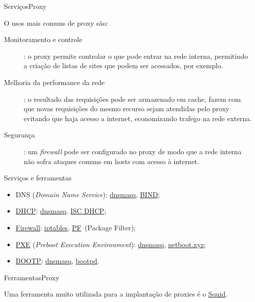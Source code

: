\begin{frame}{Serviços}{Proxy}

O usos mais comuns de proxy são:

\begin{description}
\item[Monitoramento e controle]: o proxy permite controlar o que pode
    entrar na rede interna, permitindo a criação de listas de sites
    que podem ser acessados, por exemplo.

\item[Melhoria da performance da rede]: o resultado das requisições
    pode ser armazenado em cache, fazem com que novas requisições do
    mesmo recurso sejam atendidas pelo proxy evitando que haja acesso
    a internet, economizando trafego na rede externa.

\item[Segurança]: um {\it firewall\/} pode ser configurado no proxy de modo que
a rede interna não sofra ataques comuns em hosts com acesso à
internet.
\end{description}

\end{frame}

\begin{frame}[fragile]{Serviços e ferramentas}


    \begin{itemize}
\item {DNS} ({\it Domain Name Service\/}):
\href{https://thekelleys.org.uk/dnsmasq/doc.html}{dnsmasq},
\href{https://www.isc.org/bind/}{BIND};

\item \href{https://pt.wikipedia.org/wiki/Dynamic_Host_Configuration_Protocol}{DHCP}:
\href{https://thekelleys.org.uk/dnsmasq/doc.html}{dnsmasq},
\href{https://www.isc.org/dhcp/}{ISC DHCP};

 \item \href{https://pt.wikipedia.org/wiki/Firewall}{Firewall}: \href{https://netfilter.org/}{iptables}, 
    \href{https://docs.freebsd.org/en/books/handbook/firewalls/}{PF}~(Package Filter);

\item \href{https://pt.wikipedia.org/wiki/Preboot_Execution_Environment}{PXE}
({\it Preboot Execution Environment\/}):
\href{https://thekelleys.org.uk/dnsmasq/doc.html}{dnsmasq},
\href{https://netboot.xyz/}{netboot.xyz};

\item \href{https://pt.wikipedia.org/wiki/BOOTP}{BOOTP}: 
\href{https://thekelleys.org.uk/dnsmasq/doc.html}{dnsmasq},
\href{https://www.ibm.com/docs/en/aix/7.2?topic=b-bootpd-daemon}{bootpd}.
\end{itemize}

\end{frame}

\begin{frame}{Ferramentas}{Proxy}

Uma ferramenta muito utilizada para a implantação de proxies é o
\href{http://www.squid-cache.org/}{Squid}.

\end{frame}